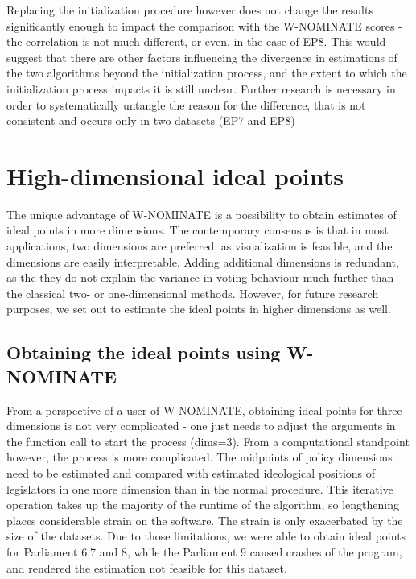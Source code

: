 \documentclass[a4paper,12pt]{report}
\begin{document}
                Replacing the initialization procedure however does not change the results significantly enough
                to impact the
                comparison with the W-NOMINATE scores - the correlation is not much different, or even, in the
                case of EP8. This
                would suggest that there are other factors influencing the divergence in estimations of the two
                algorithms
                beyond the initialization process, and the extent to which the initialization process impacts it
                is still unclear.
                Further research is necessary in order to systematically untangle the reason for the difference,
                that is not
                consistent and occurs only in two datasets (EP7 and EP8)


        \section{High-dimensional ideal points}\label{sec:high-dimensional-ideal-points}
            The unique advantage of W-NOMINATE is a possibility to obtain estimates of ideal points in more dimensions.
            The
            contemporary consensus is that in
            most applications, two dimensions are preferred, as visualization is feasible, and the dimensions are easily
            interpretable.
            Adding additional dimensions is redundant, as the they do not explain the variance in voting
            behaviour much further
            than the classical two- or one-dimensional methods.
            However, for future research purposes, we set out to
            estimate the ideal points in higher dimensions as well.

            \subsection{Obtaining the ideal points using W-NOMINATE}
                \label{subsec:obtaining-the-ideal-points-using-w-nominate}
                From a perspective of a user of W-NOMINATE, obtaining ideal points for three dimensions is not very
                complicated
                - one just needs to adjust the arguments in the function call to start the process (dims=3).
                From a
                computational standpoint however, the process is more complicated.
                The midpoints of policy dimensions need to be estimated and compared with estimated ideological
                positions of
                legislators
                in one more dimension than in the normal procedure.
                This iterative operation takes up the majority of the runtime of the algorithm,
                so lengthening places considerable strain on the software.
                The strain is only exacerbated by the size of the datasets.
                Due to those limitations, we were able to obtain ideal points for Parliament
                6,7 and 8, while the Parliament 9 caused crashes of the program, and rendered the estimation not
                feasible for this
                dataset.
\end{document}
